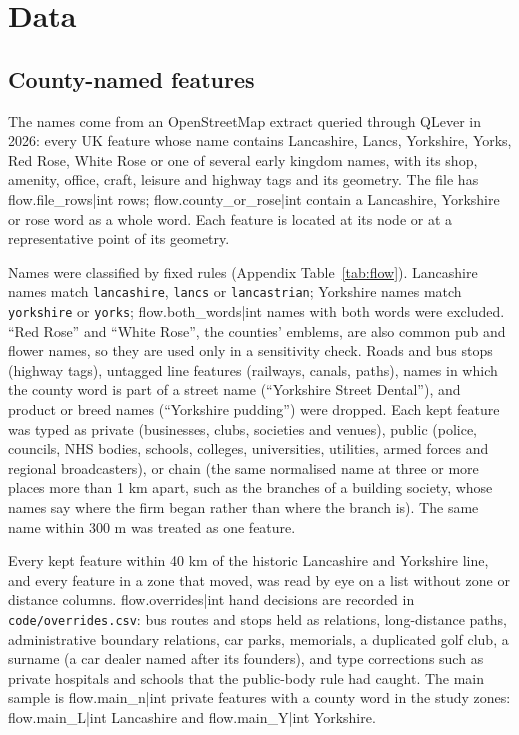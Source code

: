 \documentclass[11pt,a4paper]{article}
\begin{document}
\section{Data}\label{sec:data}
\subsection{County-named features}
The names come from an OpenStreetMap extract \citep{osm2026} queried through QLever in 2026: every UK feature whose name contains Lancashire, Lancs, Yorkshire, Yorks, Red Rose, White Rose or one of several early kingdom names, with its shop, amenity, office, craft, leisure and highway tags and its geometry. The file has {{flow.file_rows|int}} rows; {{flow.county_or_rose|int}} contain a Lancashire, Yorkshire or rose word as a whole word. Each feature is located at its node or at a representative point of its geometry.

Names were classified by fixed rules (Appendix Table~\ref{tab:flow}). Lancashire names match \texttt{lancashire}, \texttt{lancs} or \texttt{lancastrian}; Yorkshire names match \texttt{yorkshire} or \texttt{yorks}; {{flow.both_words|int}} names with both words were excluded. ``Red Rose'' and ``White Rose'', the counties' emblems, are also common pub and flower names, so they are used only in a sensitivity check. Roads and bus stops (highway tags), untagged line features (railways, canals, paths), names in which the county word is part of a street name (``Yorkshire Street Dental''), and product or breed names (``Yorkshire pudding'') were dropped. Each kept feature was typed as private (businesses, clubs, societies and venues), public (police, councils, NHS bodies, schools, colleges, universities, utilities, armed forces and regional broadcasters), or chain (the same normalised name at three or more places more than 1 km apart, such as the branches of a building society, whose names say where the firm began rather than where the branch is). The same name within 300 m was treated as one feature.

Every kept feature within 40 km of the historic Lancashire and Yorkshire line, and every feature in a zone that moved, was read by eye on a list without zone or distance columns. {{flow.overrides|int}} hand decisions are recorded in \texttt{code/overrides.csv}: bus routes and stops held as relations, long-distance paths, administrative boundary relations, car parks, memorials, a duplicated golf club, a surname (a car dealer named after its founders), and type corrections such as private hospitals and schools that the public-body rule had caught. The main sample is {{flow.main_n|int}} private features with a county word in the study zones: {{flow.main_L|int}} Lancashire and {{flow.main_Y|int}} Yorkshire.
\end{document}
